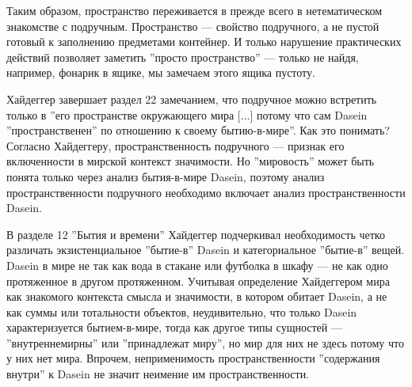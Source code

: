 \documentclass[11pt]{book}
\begin{document}
Таким образом, пространство переживается в прежде всего в нетематическом знакомстве с подручным. Пространство --- свойство подручного, а не пустой готовый к заполнению предметами контейнер. И только нарушение практических действий позволяет заметить ''просто пространство'' --- только не найдя, например, фонарик в ящике, мы замечаем этого ящика пустоту.

Хайдеггер завершает раздел 22 замечанием, что подручное можно встретить только в ''его пространстве окружающего мира [...] потому что сам Dasein ''пространственен'' по отношению к своему бытию-в-мире''. Как это понимать? Согласно Хайдеггеру, пространственность подручного --- признак его включенности в мирской контекст значимости. Но ''мировость'' может быть понята только через анализ бытия-в-мире Dasein, поэтому анализ пространственности подручного необходимо включает анализ пространственности Dasein.

В разделе 12 ''Бытия и времени'' Хайдеггер подчеркивал необходимость четко различать экзистенциальное ''бытие-в'' Dasein и категориальное ''бытие-в'' вещей. Dasein в мире не так как вода в стакане или футболка в шкафу --- не как одно протяженное в другом протяженном. Учитывая определение Хайдеггером мира как знакомого контекста смысла и значимости, в котором обитает Dasein, а не как суммы или тотальности объектов, неудивительно, что только Dasein характеризуется бытием-в-мире, тогда как другое типы сущностей --- ''внутреннемирны'' или ''принадлежат миру'', но мир для них не здесь потому что у них нет мира. Впрочем, неприменимость пространственности ''содержания внутри'' к Dasein не значит неимение им пространственности.
\end{document}
